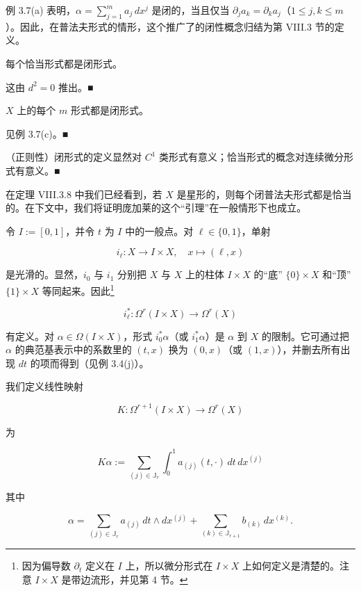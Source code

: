 \begin{examplenote}

\begin{items}
\item

例 3.7(a) 表明，$ \alpha = \sum_{j=1}^{m} a_{j}\, dx^{j} $ 是闭的，当且仅当 $ \partial_{j} a_{k} = \partial_{k} a_{j} $（$ 1 \le j, k \le m $）。因此，在普法夫形式的情形，这个推广了的闭性概念归结为第 VIII.3 节的定义。

\item

每个恰当形式都是闭形式。

\proofhead
这由 $ d^{2} = 0 $ 推出。\nobreak\hspace{0.35em}■
\item

$ X $ 上的每个 $ m $ 形式都是闭形式。

\proofhead
见例 3.7(c)。\nobreak\hspace{0.35em}■
\item

（正则性）闭形式的定义显然对 $ C^{1} $ 类形式有意义；恰当形式的概念对连续微分形式有意义。\nobreak\hspace{0.35em}■

\end{items}

在定理 VIII.3.8 中我们已经看到，若 $ X $ 是星形的，则每个闭普法夫形式都是恰当的。在下文中，我们将证明庞加莱的这个“引理”在一般情形下也成立。

令 $ I := [0,1] $，并令 $ t $ 为 $ I $ 中的一般点。对 $ \ell \in \{0,1\} $，单射

\[
i_{\ell} : X \to I \times X ,\quad x \mapsto (\ell, x)
\]

是光滑的。显然，$ i_{0} $ 与 $ i_{1} $ 分别把 $ X $ 与 $ X $ 上的柱体 $ I \times X $ 的“底” $ \{0\} \times X $ 和“顶” $ \{1\} \times X $ 等同起来。因此\footnote{因为偏导数 $ \partial_{t} $ 定义在 $ I $ 上，所以微分形式在 $ I \times X $ 上如何定义是清楚的。注意 $ I \times X $ 是带边流形，并见第 4 节。}

\[
i_{\ell}^{\ast} : \Omega^{r}(I \times X) \to \Omega^{r}(X)
\]

有定义。对 $ \alpha \in \Omega(I \times X) $，形式 $ i_{0}^{\ast}\alpha $（或 $ i_{1}^{\ast}\alpha $）是 $ \alpha $ 到 $ X $ 的限制。它可通过把 $ \alpha $ 的典范基表示中的系数里的 $ (t,x) $ 换为 $ (0,x) $（或 $ (1,x) $），并删去所有出现 $ dt $ 的项而得到（见例 3.4(j)）。

我们定义线性映射

\[
K : \Omega^{r+1}(I \times X) \to \Omega^{r}(X)
\]

为

\begin{equation}
K\alpha := \sum_{(j)\in\mathbb{J}_{r}} \int_{0}^{1} a_{(j)}(t, \cdot)\, dt\, dx^{(j)}\tag{3.16}
\end{equation}

其中

\begin{equation}
\alpha = \sum_{(j)\in\mathbb{J}_{r}} a_{(j)}\, dt \wedge dx^{(j)} + \sum_{(k)\in\mathbb{J}_{r+1}} b_{(k)}\, dx^{(k)}.\tag{3.17}
\end{equation}
\end{examplenote}

